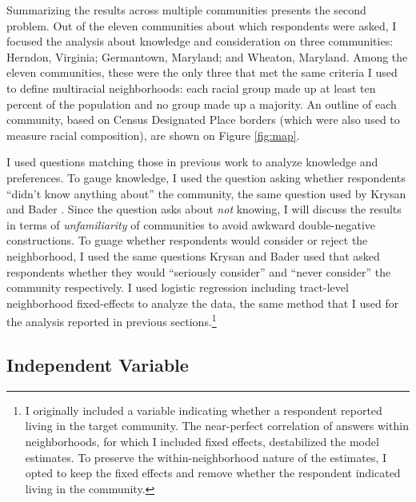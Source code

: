 \documentclass{baderart}
\begin{document}
Summarizing the results across multiple communities presents the second problem. Out of the eleven communities about which respondents were asked, I focused the analysis about knowledge and consideration on three communities: Herndon, Virginia; Germantown, Maryland; and Wheaton, Maryland. Among the eleven communities, these were the only three that met the same criteria I used to define multiracial neighborhoods: each racial group made up at least ten percent of the population and no group made up a majority. An outline of each community, based on Census Designated Place borders (which were also used to measure racial composition), are shown on Figure \ref{fig:map}.

I used questions matching those in previous work to analyze knowledge and preferences. To gauge knowledge, I used the question asking whether respondents ``didn't know anything about'' the community, the same question used by Krysan and Bader \citeyearpar{krysan_racial_2009}. Since the question asks about \emph{not} knowing, I will discuss the results in terms of \emph{unfamiliarity} of communities to avoid awkward double-negative constructions. To guage whether respondents would consider or reject the neighborhood, I used the same questions Krysan and Bader \citeyearpar[][\citealt{bader_community_2015}]{krysan_perceiving_2007, krysan_racial_2009} used that asked respondents whether they would ``seriously consider'' and ``never consider'' the community respectively. I used logistic regression including tract-level neighborhood fixed-effects to analyze the data, the same method that I used for the analysis reported in previous sections.\footnote{I originally included a variable indicating whether a respondent reported living in the target community. The near-perfect correlation of answers within neighborhoods, for which I included fixed effects, destabilized the model estimates. To preserve the within-neighborhood nature of the estimates, I opted to keep the fixed effects and remove whether the respondent indicated living in the community.}

\subsection{Independent Variable}\label{independent-variable}
\end{document}
